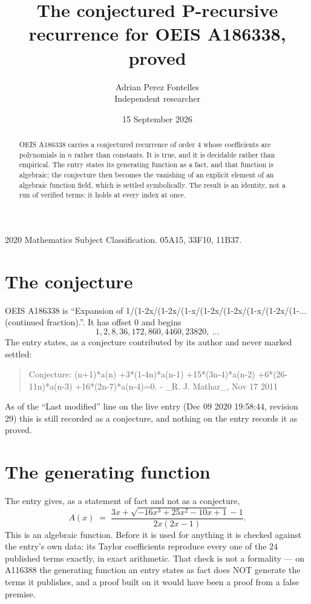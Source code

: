 \documentclass[11pt,a4paper]{article}
\title{The conjectured P-recursive recurrence for OEIS A186338, proved}
\author{Adrian Perez Fontelles\\ \small Independent researcher}
\date{15 September 2026}
\theoremstyle{plain}
\theoremstyle{definition}
\begin{document}
\maketitle

\begin{abstract}
OEIS A186338 carries a conjectured recurrence of order $4$ whose coefficients are polynomials in
$n$ rather than constants. It is true, and it is decidable rather than empirical. The entry
states its generating function as a fact, and that function is algebraic; the conjecture then
becomes the vanishing of an explicit element of an algebraic function field, which is settled
symbolically. The result is an identity, not a run of verified terms: it holds at every index
at once.
\end{abstract}

\noindent\small 2020 Mathematics Subject Classification. 05A15, 33F10, 11B37.\normalsize

\section{The conjecture}

OEIS A186338 is ``Expansion of 1/(1-2x/(1-2x/(1-x/(1-2x/(1-2x/(1-x/(1-2x/(1-... (continued fraction).''. It has offset $0$ and begins
\[
1, 2, 8, 36, 172, 860, 4460, 23820,\ \dots
\]
The entry states, as a conjecture contributed by its author and never marked settled:
\begin{quote}\raggedright\small
Conjecture: (n+1)*a(n) +3*(1-4n)*a(n-1) +15*(3n-4)*a(n-2) +6*(26-11n)*a(n-3) +16*(2n-7)*a(n-4)=0. - \_R. J. Mathar\_, Nov 17 2011
\end{quote}
As of the ``Last modified'' line on the live entry (Dec 09 2020 19:58:44, revision 29)
this is still recorded as a conjecture, and nothing on the entry records it as proved.

\section{The generating function}

The entry gives, as a statement of fact and not as a conjecture,
\[
A(x)\;=\;\frac{3 x + \sqrt{- 16 x^{3} + 25 x^{2} - 10 x + 1} - 1}{2 x \left(2 x - 1\right)} .
\]
This is an algebraic function. Before it is used for anything it is checked against the entry's
own data: its Taylor coefficients reproduce every one of the $24$ published terms
exactly, in exact arithmetic. That check is not a formality --- on A116388 the generating
function an entry states as fact does NOT generate the terms it publishes, and a proof built on
it would have been a proof from a false premise.
\end{document}
